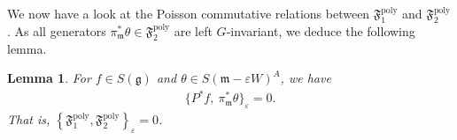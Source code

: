 \documentclass[11pt]{amsart}
\newtheorem{lemma}[theorem]{Lemma}
\theoremstyle{definition}
\newtheorem{definition}[theorem]{Definition}
\theoremstyle{plain}
\theoremstyle{conclusion}
\begin{document}

 
We now have a look at the Poisson commutative relations between $\mathfrak{F}_1^{\mathrm{poly}}$ and $\mathfrak{F}_2^{\mathrm{poly}}$. As all generators $\pi_\mathfrak{m}^*\theta \in \mathfrak{F}_2^{\mathrm{poly}}$ are left $G$-invariant, we deduce the following lemma. 

\begin{lemma}
\label{lem:interzero}
  For $f\in S(\mathfrak{g})$ and $\theta\in S(\mathfrak{m}-\varepsilon W)^A$, we have \begin{align*}
\{ P^*f,\ \pi_{\mathfrak{m}}^*\theta \}_\varepsilon=0 .
\end{align*}  That is, $\left\{\mathfrak{F}_1^{\mathrm{poly}},\mathfrak{F}_2^{\mathrm{poly}}\right\}_\varepsilon = 0$.
\end{lemma} 
\end{document}
